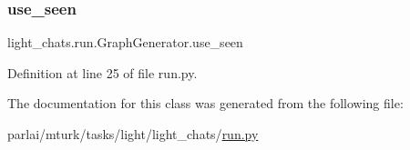 \subsubsection{\texorpdfstring{use\+\_\+seen}{use\_seen}}
{\footnotesize\ttfamily light\+\_\+chats.\+run.\+Graph\+Generator.\+use\+\_\+seen}



Definition at line 25 of file run.\+py.



The documentation for this class was generated from the following file\+:\begin{DoxyCompactItemize}
\item 
parlai/mturk/tasks/light/light\+\_\+chats/\hyperlink{parlai_2mturk_2tasks_2light_2light__chats_2run_8py}{run.\+py}\end{DoxyCompactItemize}
